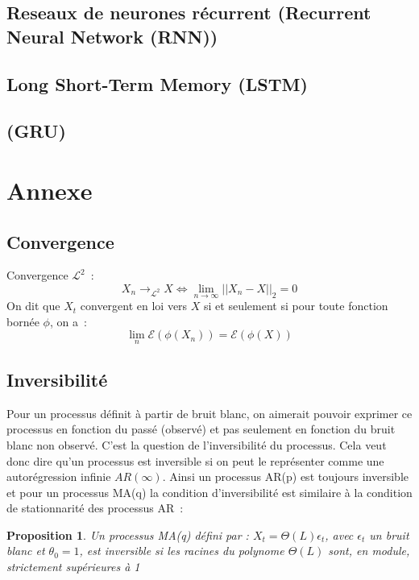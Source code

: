 \documentclass[11pt]{scrartcl} %
\newtheorem{pro}[theorem]{Proposition}
\begin{document}
\subsection{Reseaux de neurones récurrent (Recurrent Neural Network (RNN))}
\subsection{Long Short-Term Memory (LSTM)}
\subsection{(GRU)}

\section{Annexe}
\subsection{Convergence}
Convergence $\mathcal{L}^2$~:
$$
X_n\rightarrow_{\mathcal{L^2}} X \Leftrightarrow  \lim_{n\rightarrow \infty}||X_n-X||_2=0
$$
On dit que $X_t$ convergent en loi vers $X$ si et seulement si pour toute fonction bornée $\phi$, on a~:~
$$
\lim_{n}\mathcal{E}(\phi(X_n))=\mathcal{E}\left(\phi(X)\right)
$$
\subsection{Inversibilité}
Pour un processus définit à partir de bruit blanc, on aimerait pouvoir exprimer ce processus en fonction du passé (observé) et pas seulement en fonction du bruit blanc non observé. C'est la question de l'inversibilité du processus. Cela veut donc dire qu'un processus est inversible si on peut le représenter comme une autorégression infinie $AR(\infty)$. Ainsi un processus AR(p) est toujours inversible et pour un processus MA(q) la condition d'inversibilité est similaire à la condition de stationnarité des processus AR~:
\begin{pro}
Un processus MA(q) défini par : $X_t=\Theta(L)\epsilon_t$, avec $\epsilon_t$ un bruit blanc et $\theta_0=1$, est inversible si les racines du polynome $ \Theta(L)$ sont, en module, strictement supérieures à 1
\end{pro}
\end{document}
